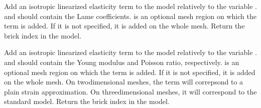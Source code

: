 \documentclass[a4paper,11pt,english]{sphinxmanual}
\begin{document}
\begin{fulllineitems}
\begin{fulllineitems}
\label{\detokenize{python/cmdref_Model:getfem.Model.add_isotropic_linearized_elasticity_brick}}
Add an isotropic linearized elasticity term to the model relatively to
the variable .  and  should
contain the Lame coefficients.  is an optional mesh region
on which the term is added. If it is not specified, it is added
on the whole mesh. Return the brick index in the model.

\end{fulllineitems}


\begin{fulllineitems}
\label{\detokenize{python/cmdref_Model:getfem.Model.add_isotropic_linearized_elasticity_brick_pstrain}}
Add an isotropic linearized elasticity term to the model relatively to
the variable .  and  should
contain the Young modulus and Poisson ratio, respectively.
 is an optional mesh region on which the term is added.
If it is not specified, it is added
on the whole mesh.
On two\sphinxhyphen{}dimensional meshes, the term will correpsond to a plain strain
approximation. On three\sphinxhyphen{}dimensional meshes, it will correspond to the
standard model. 
Return the brick index in the model.

\end{fulllineitems}



\end{fulllineitems}
\end{document}
